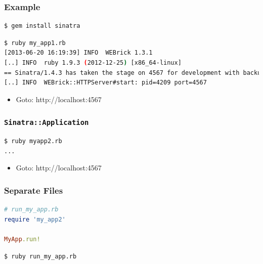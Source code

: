 \documentclass{beamer}
\begin{document}
\begin{frame}[fragile]\frametitle{Example} 

  \begin{lstlisting}[language=bash, escapechar={^}]
$ gem install sinatra
  \end{lstlisting}

  

  \begin{lstlisting}[language=bash, escapechar={^}]
$ ruby my_app1.rb
[2013-06-20 16:19:39] INFO  WEBrick 1.3.1
[..] INFO  ruby 1.9.3 (2012-12-25) [x86_64-linux]
== Sinatra/1.4.3 has taken the stage on 4567 for development with backup from WEBrick
[..] INFO  WEBrick::HTTPServer#start: pid=4209 port=4567
  \end{lstlisting}

  \begin{itemize}
    \item Goto: http://localhost:4567
  \end{itemize}
\end{frame}




\begin{frame}[fragile]\frametitle{\texttt{Sinatra::Application}} 

  

  \begin{lstlisting}[language=bash, escapechar={^}]
$ ruby myapp2.rb
...
  \end{lstlisting}

  \begin{itemize}
    \item Goto: http://localhost:4567
  \end{itemize}

\end{frame}






\begin{frame}[fragile]\frametitle{Separate Files} 

  

  \begin{lstlisting}[language=ruby, escapechar={^}]
# run_my_app.rb
require 'my_app2'

MyApp.run!
  \end{lstlisting}

  \begin{lstlisting}[language=bash, escapechar={^}]
$ ruby run_my_app.rb
  \end{lstlisting}

\end{frame}
\end{document}

